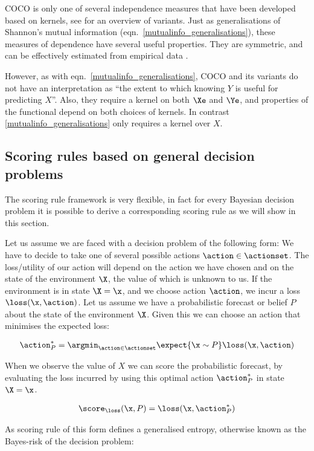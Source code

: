 COCO is only one of several independence measures that have been developed based on kernels, see \cite{HSIC} for an overview of variants. Just as generalisations of Shannon's mutual information (eqn.\ \eqref{mutualinfo_generalisations}), these measures of dependence have several useful properties. They are symmetric, and can be effectively estimated from empirical data \cite{}.

However, as with eqn.\ \eqref{mutualinfo_generalisations}, COCO and its variants do not have an interpretation as ``the extent to which knowing $Y$ is useful for predicting $X$''. Also, they require a kernel on both $\Xe$ and $\Ye$, and properties of the functional depend on both choices of kernels. In contrast \eqref{mutualinfo_generalisations} only requires a kernel over $X$.

\subsection{Scoring rules based on general decision problems}

The scoring rule framework is very flexible, in fact for every Bayesian decision problem it is possible to derive a corresponding scoring rule as we will show in this section.

Let us assume we are faced with a decision problem of the following form: We have to decide to take one of several possible actions $\action\in\actionset$. The loss/utility of our action will depend on the action we have chosen and on the state of the environment $\X$, the value of which is unknown to us. If the environment is in state $\X=\x$, and we choose action $\action$, we incur a loss $\loss(\x,\action)$.
Let us assume we have a probabilistic forecast or belief $P$ about the state of the environment $\X$. Given this we can choose an action that minimises the expected loss:

\begin{align}
	\action^{*}_{P} = \argmin_{\action\in\actionset} \expect{\x \sim P} \loss(\x,\action)
\end{align}

When we observe the value of $X$ we can score the probabilistic forecast, by evaluating the loss incurred by using this optimal action $\action^{*}_{P}$ in state $\X=\x$.

\begin{align}
	\score_{\loss}(\x,P) = \loss(\x,\action^{*}_{P})
\end{align}

As scoring rule of this form defines a generalised entropy, otherwise known as the Bayes-risk of the decision problem:

